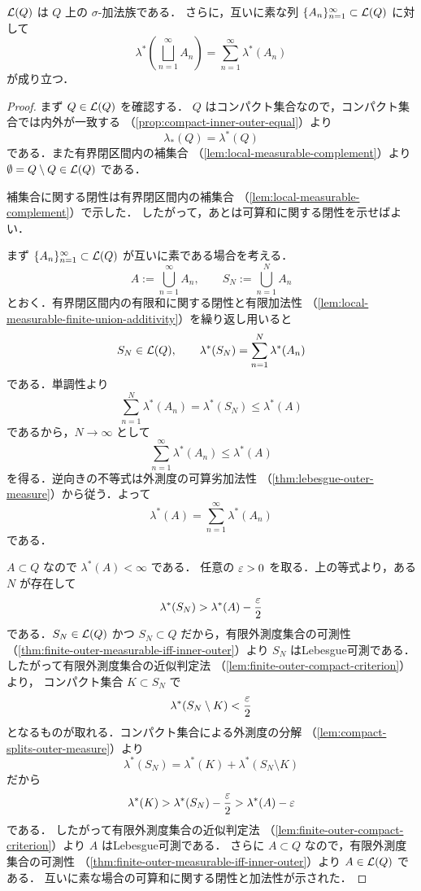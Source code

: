 \begin{theorem}\label{thm:local-measurable-sigma-algebra}
$\mathcal L(Q)$ は $Q$ 上の $\sigma$-加法族である．
さらに，互いに素な列 $\{A_n\}_{n=1}^{\infty}\subset\mathcal L(Q)$ に対して
\[
\lambda^*\left(\bigsqcup_{n=1}^{\infty}A_n\right)
=
\sum_{n=1}^{\infty}\lambda^*(A_n)
\]
が成り立つ．
\end{theorem}
\begin{proof}
まず $Q\in\mathcal L(Q)$ を確認する．
$Q$ はコンパクト集合なので，コンパクト集合では内外が一致する
（\cref{prop:compact-inner-outer-equal}）より
\[
\lambda_*(Q)=\lambda^*(Q)
\]
である．また有界閉区間内の補集合
（\cref{lem:local-measurable-complement}）より $\emptyset=Q\setminus Q\in\mathcal L(Q)$ である．

補集合に関する閉性は有界閉区間内の補集合
（\cref{lem:local-measurable-complement}）で示した．
したがって，あとは可算和に関する閉性を示せばよい．

まず $\{A_n\}_{n=1}^{\infty}\subset\mathcal L(Q)$ が互いに素である場合を考える．
\[
A:=\bigcup_{n=1}^{\infty}A_n,
\qquad
S_N:=\bigcup_{n=1}^{N}A_n
\]
とおく．有界閉区間内の有限和に関する閉性と有限加法性
（\cref{lem:local-measurable-finite-union-additivity}）を繰り返し用いると
\[
S_N\in\mathcal L(Q),
\qquad
\lambda^*(S_N)=\sum_{n=1}^{N}\lambda^*(A_n)
\]
である．単調性より
\[
\sum_{n=1}^{N}\lambda^*(A_n)=\lambda^*(S_N)\le\lambda^*(A)
\]
であるから，$N\to\infty$ として
\[
\sum_{n=1}^{\infty}\lambda^*(A_n)\le\lambda^*(A)
\]
を得る．逆向きの不等式は外測度の可算劣加法性
（\cref{thm:lebesgue-outer-measure}）から従う．よって
\[
\lambda^*(A)=\sum_{n=1}^{\infty}\lambda^*(A_n)
\]
である．

$A\subset Q$ なので $\lambda^*(A)<\infty$ である．
任意の $\varepsilon>0$ を取る．上の等式より，ある $N$ が存在して
\[
\lambda^*(S_N)>\lambda^*(A)-\frac{\varepsilon}{2}
\]
である．$S_N\in\mathcal L(Q)$ かつ $S_N\subset Q$ だから，有限外測度集合の可測性
（\cref{thm:finite-outer-measurable-iff-inner-outer}）より $S_N$ はLebesgue可測である．
したがって有限外測度集合の近似判定法
（\cref{lem:finite-outer-compact-criterion}）より，
コンパクト集合 $K\subset S_N$ で
\[
\lambda^*(S_N\setminus K)<\frac{\varepsilon}{2}
\]
となるものが取れる．コンパクト集合による外測度の分解
（\cref{lem:compact-splits-outer-measure}）より
\[
\lambda^*(S_N)=\lambda^*(K)+\lambda^*(S_N\setminus K)
\]
だから
\[
\lambda^*(K)>\lambda^*(S_N)-\frac{\varepsilon}{2}
>\lambda^*(A)-\varepsilon
\]
である．
したがって有限外測度集合の近似判定法
（\cref{lem:finite-outer-compact-criterion}）より $A$ はLebesgue可測である．
さらに $A\subset Q$ なので，有限外測度集合の可測性
（\cref{thm:finite-outer-measurable-iff-inner-outer}）より $A\in\mathcal L(Q)$ である．
互いに素な場合の可算和に関する閉性と加法性が示された．


\end{proof}
